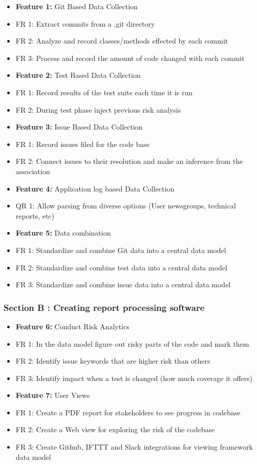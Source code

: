 \documentclass[11pt,]{article}
\begin{document}
\begin{itemize}
\item
  \textbf{Feature 1:} Git Based Data Collection
\item
  FR 1: Extract commits from a .git directory
\item
  FR 2: Analyze and record classes/methods effected by each commit
\item
  FR 3: Process and record the amount of code changed with each commit
\item
  \textbf{Feature 2:} Test Based Data Collection
\item
  FR 1: Record results of the test suite each time it is run
\item
  FR 2: During test phase inject previous risk analysis
\item
  \textbf{Feature 3:} Issue Based Data Collection
\item
  FR 1: Record issues filed for the code base
\item
  FR 2: Connect issues to their resolution and make an inference from
  the association
\item
  \textbf{Feature 4:} Application log based Data Collection
\item
  QR 1: Allow parsing from diverse options (User newsgroups, technical
  reports, etc)
\item
  \textbf{Feature 5:} Data combination
\item
  FR 1: Standardize and combine Git data into a central data model
\item
  FR 2: Standardize and combine test data into a central data model
\item
  FR 3: Standardize and combine issue data into a central data model
\end{itemize}

\subsubsection{Section B : Creating report processing
software}\label{section-b-creating-report-processing-software}

\begin{itemize}
\item
  \textbf{Feature 6:} Conduct Risk Analytics
\item
  FR 1: In the data model figure out risky parts of the code and mark
  them
\item
  FR 2: Identify issue keywords that are higher risk than others
\item
  FR 3: Identify impact when a test is changed (how much coverage it
  offers)
\item
  \textbf{Feature 7:} User Views
\item
  FR 1: Create a PDF report for stakeholders to see progress in codebase
\item
  FR 2: Create a Web view for exploring the risk of the codebase
\item
  FR 3: Create Github, IFTTT and Slack integrations for viewing
  framework data model
\end{itemize}
\end{document}
